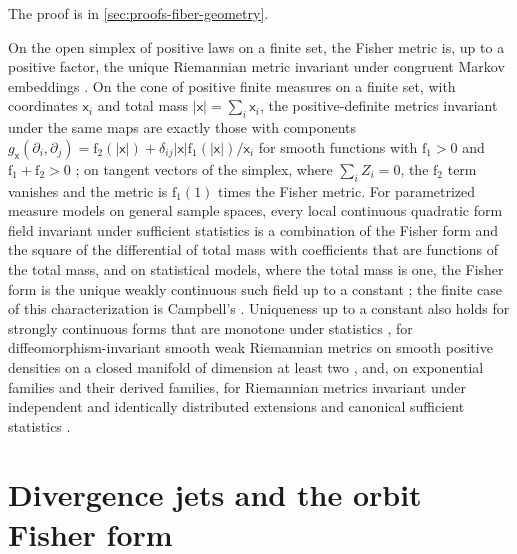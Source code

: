 The proof is in \cref{sec:proofs-fiber-geometry}.

On the open simplex of positive laws on a finite set, the Fisher metric is, up to a
positive factor, the unique Riemannian metric invariant under congruent Markov
embeddings \citep[Lemma~11.3, p.~161]{Cencov1982}.  On the cone of positive finite measures on a
finite set, with coordinates $\mathsf x_i$ and total mass $|\mathsf x|=\sum_i\mathsf x_i$,
the positive-definite metrics invariant under the same maps are exactly those with
components $g_{\mathsf x}(\partial_i,\partial_j)=\mathrm f_2(|\mathsf x|)
+\delta_{ij}|\mathsf x|\mathrm f_1(|\mathsf x|)/\mathsf x_i$ for smooth functions with
$\mathrm f_1>0$ and $\mathrm f_1+\mathrm f_2>0$ \citep{Campbell1986}; on tangent vectors
of the simplex, where $\sum_iZ_i=0$, the $\mathrm f_2$ term vanishes and the metric is
$\mathrm f_1(1)$ times the Fisher metric.  For parametrized measure models on general
sample spaces, every local continuous quadratic form field invariant under sufficient
statistics is a combination of the Fisher form and the square of the differential of
total mass with coefficients that are functions of the total mass, and on statistical
models, where the total mass is one, the Fisher form is the unique weakly continuous such
field up to a constant \citep[Main Theorem~2.10]{Ay2015}; the finite case of this
characterization is Campbell's \citep[Section~1]{Le2017}.  Uniqueness up to a constant
also holds for strongly continuous forms that are monotone under statistics
\citep[Theorem~1.4]{Le2017}, for diffeomorphism-invariant smooth weak Riemannian metrics
on smooth positive densities on a closed manifold of dimension at least two
\citep[Theorem in the introduction]{BauerBruverisMichor2016}, and, on exponential
families and their derived families, for Riemannian metrics invariant under independent
and identically distributed extensions and canonical sufficient statistics
\citep[Theorem~1]{Dowty2018}.  

\section{Divergence jets and the orbit Fisher form}
\label{sec:pb-divergence-jets}

